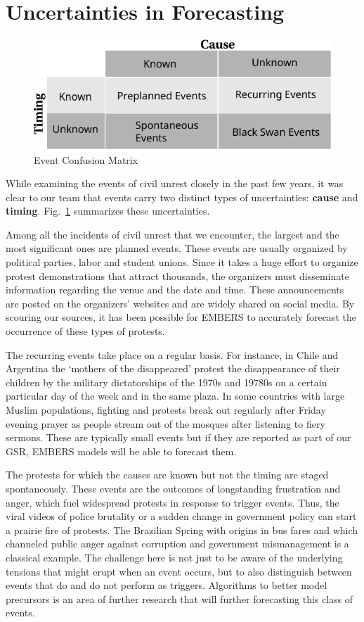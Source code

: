\section{Uncertainties in Forecasting}
\begin{figure}
\includegraphics[width=\columnwidth]{figures/cu/event_confusionMatrix}
\caption{Event Confusion Matrix}
\label{rumsfeld}
\end{figure}

While examining the events of civil unrest closely
in the past few years, it was clear to our
team that events carry two distinct types of uncertainties: {\bf cause} 
and {\bf timing}.
Fig.~\ref{rumsfeld} summarizes these uncertainties.

Among all the incidents of civil unrest that we encounter, the largest and the most significant ones 
are planned events.  These events are usually organized by political parties, labor and student unions.  
Since it takes a huge effort to organize protest demonstrations that 
attract thousands, the organizers must disseminate information regarding the venue 
and the date and time.  These announcements are posted on the organizers’ websites and 
are widely shared on social media.  By scouring our sources,
it has been possible for EMBERS to accurately forecast the occurrence of these types of protests.

The recurring events take place on a regular basis.  For instance, in Chile and Argentina the 
`mothers of the disappeared' protest the disappearance of their children by the military dictatorships 
of the 1970s and 19780s on a certain particular day of the week and in the same plaza. 
In some countries with large Muslim populations, fighting and protests break out regularly after 
Friday evening prayer as people stream out of the mosques after listening 
to fiery sermons. These are typically small events but if they are reported as part of our GSR,
EMBERS models will be able to forecast them.

The protests for which the causes are known but not the timing are staged spontaneously.  These 
events are the outcomes of longstanding frustration and anger, which fuel widespread 
protests in response to trigger events.  Thus, the viral videos of police brutality or 
a sudden change in government policy can start a prairie fire of protests.  The Brazilian
Spring with origins in bus fares and which channeled
public anger against corruption and government mismanagement is a classical example. The challenge here
is not just to be aware of the underlying tensions that might erupt when an event occurs, but to also
distinguish between events that do and do not perform as triggers. Algorithms to better model
precursors is an area of further research that will further forecasting this class of events.


